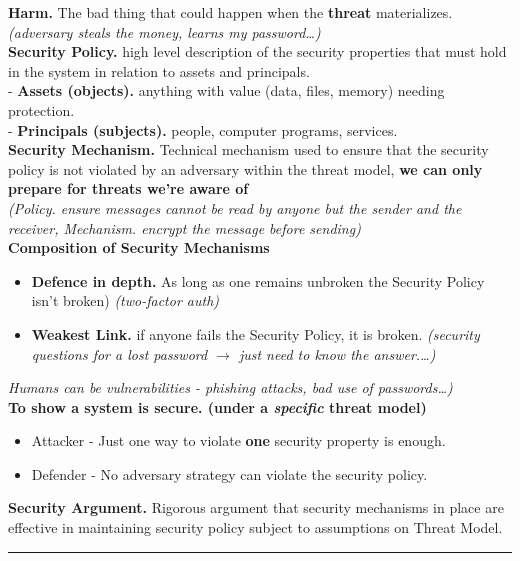 \documentclass[9pt, a4paper]{extarticle}
\makeatletter
\renewcommand{\hline}{\noalign{\vskip 2px}\hrule\@height\arrayrulewidth\@width\linewidth\noalign{\vskip 2px}}
\makeatother
\begin{document}
\begin{minipage}[t]{0.495\textwidth}
	\noindent \textbf{Harm.} The bad thing that could happen when the \textbf{threat} materializes. \textit{(adversary steals the money, learns my password\dots)}\\
	\noindent \textbf{Security Policy.} high level description of the security properties that must hold in the system in relation to assets and principals.\\
	- \textbf{Assets (objects).} anything with value (data, files, memory) needing protection.\\
	- \textbf{Principals (subjects).} people, computer programs, services.\\
	\noindent \textbf{Security Mechanism.} Technical mechanism used to ensure that the security policy is not violated by an adversary within the threat model, \textbf{we can only prepare for threats we're aware of} \\\textit{(Policy. ensure messages cannot be read by anyone but the sender and the receiver, Mechanism. encrypt the message before sending)}\\
	\noindent \textbf{Composition of Security Mechanisms}
	\begin{itemize}
		\item[-] \textbf{Defence in depth.} As long as one remains unbroken the Security Policy isn't broken) \textit{(two-factor auth)}
		\item[-] \textbf{Weakest Link.} if anyone fails the Security Policy, it is broken. \textit{(security questions for a lost password $\rightarrow$ just need to know the answer.\dots)}
	\end{itemize}
	\textit{Humans can be vulnerabilities - phishing attacks, bad use of passwords\dots)}\\
	\noindent \textbf{To show a system is secure. (under a \textit{specific} threat model)}
	\begin{itemize}
		\item[] Attacker - Just one way to violate \textbf{one} security property is enough.
		\item[] Defender - No adversary strategy can violate the security policy.
	\end{itemize}
	\noindent \textbf{Security Argument.} Rigorous argument that security mechanisms in place are effective in maintaining security policy subject to assumptions on Threat Model.
\end{minipage}
\hline
\end{document}
